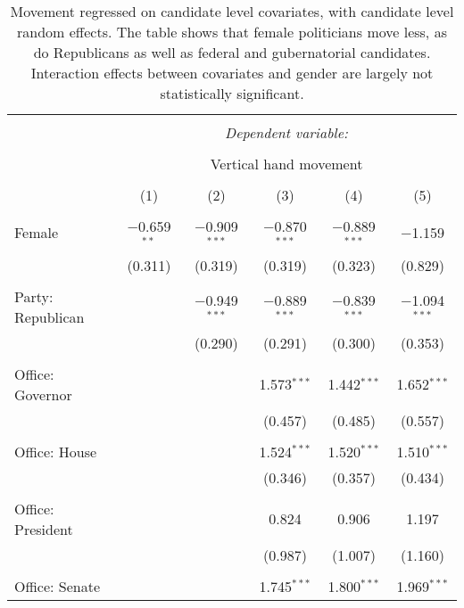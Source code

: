 
\begin{table}[!htbp] \centering 
  \caption{Movement regressed on candidate level covariates, with candidate level random effects. The table shows that female politicians move less, as do Republicans as well as federal and gubernatorial candidates. Interaction effects between covariates and gender are largely not statistically significant.} 
  \label{handmovement_plm} 
\scriptsize 
\begin{tabular}{@{\extracolsep{5pt}}lccccc} 
\\[-1.8ex]\hline 
\hline \\[-1.8ex] 
 & \multicolumn{5}{c}{\textit{Dependent variable:}} \\ 
\cline{2-6} 
\\[-1.8ex] & \multicolumn{5}{c}{Vertical hand movement} \\ 
\\[-1.8ex] & (1) & (2) & (3) & (4) & (5)\\ 
\hline \\[-1.8ex] 
 Female & $-$0.659$^{**}$ & $-$0.909$^{***}$ & $-$0.870$^{***}$ & $-$0.889$^{***}$ & $-$1.159 \\ 
  & (0.311) & (0.319) & (0.319) & (0.323) & (0.829) \\ 
  & & & & & \\ 
 Party: Republican &  & $-$0.949$^{***}$ & $-$0.889$^{***}$ & $-$0.839$^{***}$ & $-$1.094$^{***}$ \\ 
  &  & (0.290) & (0.291) & (0.300) & (0.353) \\ 
  & & & & & \\ 
 Office: Governor &  &  & 1.573$^{***}$ & 1.442$^{***}$ & 1.652$^{***}$ \\ 
  &  &  & (0.457) & (0.485) & (0.557) \\ 
  & & & & & \\ 
 Office: House &  &  & 1.524$^{***}$ & 1.520$^{***}$ & 1.510$^{***}$ \\ 
  &  &  & (0.346) & (0.357) & (0.434) \\ 
  & & & & & \\ 
 Office: President &  &  & 0.824 & 0.906 & 1.197 \\ 
  &  &  & (0.987) & (1.007) & (1.160) \\ 
  & & & & & \\ 
 Office: Senate &  &  & 1.745$^{***}$ & 1.800$^{***}$ & 1.969$^{***}$ \\ 

\end{tabular}
\end{table}
